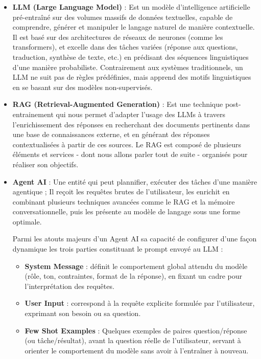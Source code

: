 \documentclass[12pt,a4paper]{report}
\begin{document}
	\begin{itemize}
		
		\item \textbf{LLM (Large Language Model)} : Est un modèle d'intelligence artificielle pré-entraîné sur des volumes massifs de données textuelles, capable de comprendre, générer et manipuler le langage naturel de manière contextuelle. Il est basé sur des architectures de réseaux de neurones (comme les transformers), et excelle dans des tâches variées (réponse aux questions, traduction, synthèse de texte, etc.) en prédisant des séquences linguistiques d'une manière probabiliste. Contrairement aux systèmes traditionnels, un LLM ne suit pas de règles prédéfinies, mais apprend des motifs linguistiques en se basant sur des modèles non-supervisés.
		
		\item \textbf{RAG (Retrieval-Augmented Generation)} : Est une technique post-entrainement qui nous permet d'adapter l'usage des LLMs à travers l'enrichissement des réponses en recherchant des documents pertinents dans une base de connaissances externe, et en générant des réponses contextualisées à partir de ces sources. \cite{rag}
		Le RAG est composé de plusieurs éléments et services - dont nous allons parler tout de suite - organisés pour réaliser son objectifs.
		
		\item \textbf{Agent AI} : Une entité qui peut plannifier, exécuter des tâches d'une manière agentique ; Il reçoit les requêtes brutes de l'utilisateur, les enrichit en combinant plusieurs techniques avancées comme le RAG et la mémoire conversationnelle, puis les présente au modèle de langage sous une forme optimale.
		
		Parmi les atouts majeurs d'un Agent AI sa capacité de configurer d'une façon dynamique les trois parties constituant le prompt envoyé au LLM :
		
		\begin{itemize}
			
			\item \textbf{System Message} : définit le comportement global attendu du modèle (rôle, ton, contraintes, format de la réponse), en fixant un cadre pour l’interprétation des requêtes.
			
			\item \textbf{User Input} : correspond à la requête explicite formulée par l’utilisateur, exprimant son besoin ou sa question.
			
			\item \textbf{Few Shot Examples} : Quelques exemples de paires question/réponse (ou tâche/résultat), avant la question réelle de l’utilisateur, servant à orienter le comportement du modèle sans avoir à l'entraîner à nouveau.
			

\end{itemize}
\end{itemize}
\end{document}
